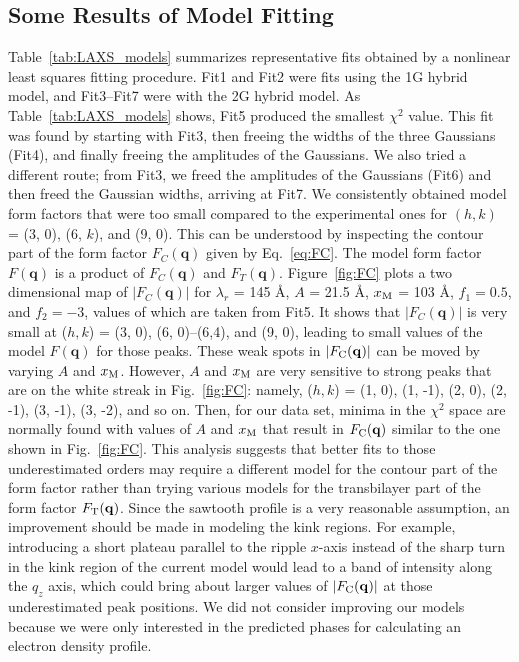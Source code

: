 \subsection{Some Results of Model Fitting}\label{sec:LAXS_model_results}
Table~\ref{tab:LAXS_models} summarizes representative fits obtained by a nonlinear
least squares fitting procedure. Fit1 and Fit2 were fits using the 1G hybrid model,
and Fit3--Fit7 were with the 2G hybrid model. As Table~\ref{tab:LAXS_models} shows, 
Fit5 produced the smallest $\chi^2$ value. This fit was found by 
starting with
Fit3, then freeing the widths of the three Gaussians (Fit4), 
and finally freeing the amplitudes of the Gaussians.
We also tried a different route; from Fit3, we freed 
the amplitudes of 
the Gaussians (Fit6) and then freed the Gaussian widths, 
arriving at Fit7. 
We consistently obtained model
form factors that were too small compared to the experimental ones 
for $(h,k)$ = (3, 0), (6, $k$), and (9, 0). This can be understood by
inspecting the contour part of the form factor $F_C(\mathbf{q})$ 
given by Eq.~\ref{eq:FC}.
The model form factor $F(\mathbf{q})$ is a product of
$F_C(\mathbf{q})$ and $F_T(\mathbf{q})$.
Figure~\ref{fig:FC} plots a two dimensional map of $|F_C(\mathbf{q})|$ for
$\lambda_r$ = 145 \AA, $A$ = 21.5 \AA, $x_\textrm{M}$ = 103 \AA, $f_1=0.5$,
and $f_2=-3$, values of which are taken from Fit5.
It shows that $|F_C(\mathbf{q})|$ is very small at 
($h, k$) = (3, 0), (6, 0)--(6,4), and (9, 0), leading to small values of
the model $F(\mathbf{q})$ for those peaks. These weak spots in $|F_\mathrm{C}(\mathbf{q})|$
can be moved by varying $A$ and $x_\textrm{M}$. However, $A$ and $x_\textrm{M}$ are very 
sensitive to strong peaks that are on the white streak in Fig.~\ref{fig:FC}:
namely, ($h, k$) = (1, 0), (1, -1), (2, 0), (2, -1), (3, -1), (3, -2), and so on.
Then, for our data set, minima in the $\chi^2$ space are normally found
with values of $A$ and $x_\textrm{M}$ that result in $F_\mathrm{C}(\mathbf{q})$ similar to the 
one shown in Fig.~\ref{fig:FC}.
This analysis 
suggests that better fits to those underestimated orders may require a different model
for the contour part of the form factor rather than trying various
models for the transbilayer part of the form factor $F_\mathrm{T}(\mathbf{q})$. 
Since the sawtooth profile is a very reasonable assumption, an improvement
should be made in modeling the kink regions.
For example, introducing a short plateau parallel to the ripple $x$-axis
instead of the sharp turn in the kink region of the current model would
lead to a band of intensity along the $q_z$ axis, which could bring about 
larger values of $|F_\mathrm{C}(\mathbf{q})|$ at those underestimated peak positions.
We did not consider improving our models because we were only interested in the predicted
phases for calculating an electron density profile.

